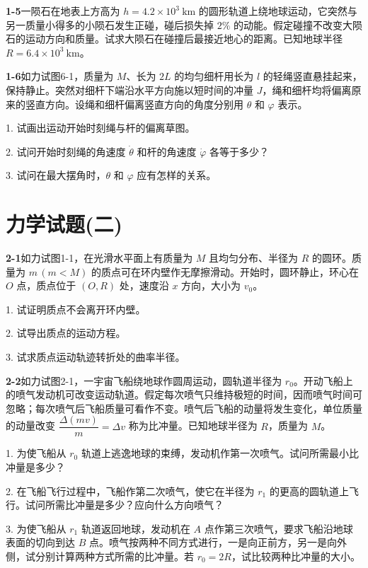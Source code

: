 \newpage
\textbf{1-5}\quad 一陨石在地表上方高为 $h = 4.2 \times 10^{3}\ \mathrm{km}$ 的圆形轨道上绕地球运动，它突然与另一质量小得多的小陨石发生正碰，碰后损失掉 $2\%$ 的动能。假定碰撞不改变大陨石的运动方向和质量。试求大陨石在碰撞后最接近地心的距离。已知地球半径 $R = 6.4 \times 10^{3}\ \mathrm{km}$。
\vfill

\textbf{1-6}\quad 如力试图6-1，质量为 $M$、长为 $2L$ 的均匀细杆用长为 $l$ 的轻绳竖直悬挂起来，保持静止。突然对细杆下端沿水平方向施以短时间的冲量 $J$，绳和细杆均将偏离原来的竖直方向。设绳和细杆偏离竖直方向的角度分别用 $\theta$ 和 $\varphi$ 表示。


1. 试画出运动开始时刻绳与杆的偏离草图。

2. 试问开始时刻绳的角速度 $\dot{\theta}$ 和杆的角速度 $\dot{\varphi}$ 各等于多少？

3. 试问在最大摆角时，$\theta$ 和 $\varphi$ 应有怎样的关系。

\vfill


\section*{力学试题(二)}
\vfill

\newpage
\textbf{2-1}\quad 如力试图1-1，在光滑水平面上有质量为 $M$ 且均匀分布、半径为 $R$ 的圆环。质量为 $m\,(m < M)$ 的质点可在环内壁作无摩擦滑动。开始时，圆环静止，环心在 $O$ 点，质点位于 $(O, R)$ 处，速度沿 $x$ 方向，大小为 $v_{0}$。

1. 试证明质点不会离开环内壁。

2. 试导出质点的运动方程。

3. 试求质点运动轨迹转折处的曲率半径。
\vfill

\textbf{2-2}\quad 如力试图2-1，一宇宙飞船绕地球作圆周运动，圆轨道半径为 $r_{0}$。开动飞船上的喷气发动机可改变运动轨道。假定每次喷气只维持极短的时间，因而喷气时间可忽略；每次喷气后飞船质量可看作不变。喷气后飞船的动量将发生变化，单位质量的动量改变 $\dfrac{\Delta(mv)}{m} = \Delta v$ 称为比冲量。已知地球半径为 $R$，质量为 $M$。


1. 为使飞船从 $r_{0}$ 轨道上逃逸地球的束缚，发动机作第一次喷气。试问所需最小比冲量是多少？

2. 在飞船飞行过程中，飞船作第二次喷气，使它在半径为 $r_{1}$ 的更高的圆轨道上飞行。试问所需比冲量是多少？应向什么方向喷气？

3. 为使飞船从 $r_{1}$ 轨道返回地球，发动机在 $A$ 点作第三次喷气，要求飞船沿地球表面的切向到达 $B$ 点。喷气按两种不同方式进行，一是向正前方，另一是向外侧，试分别计算两种方式所需的比冲量。若 $r_{0} = 2R$，试比较两种比冲量的大小。
\vfill

